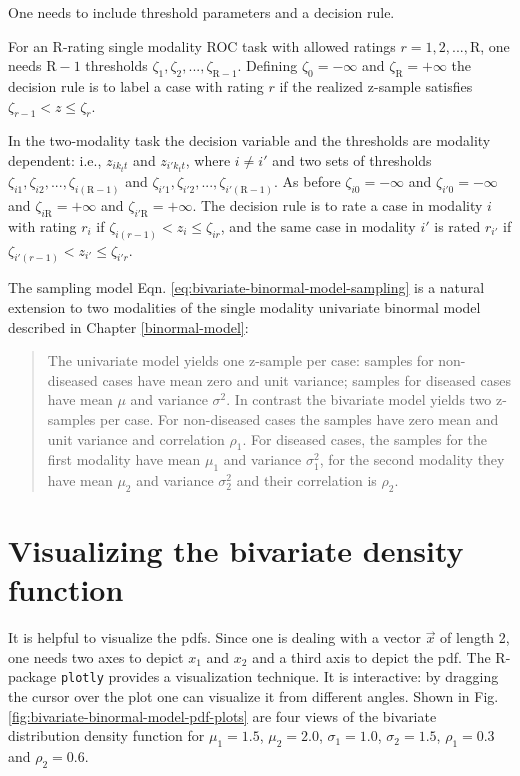 \documentclass[
]{book}
\begin{document}
One needs to include threshold parameters and a decision rule.

For an R-rating single modality ROC task with allowed ratings \(r = 1, 2, ..., \text{R}\), one needs \(\text{R}-1\) thresholds \(\zeta_1,\zeta_2,...,\zeta_{\text{R}-1}\). Defining \(\zeta_0 = -\infty\) and \(\zeta_{\text{R}} = +\infty\) the decision rule is to label a case with rating \(r\) if the realized z-sample satisfies \(\zeta_{r-1} < z \le \zeta_r\).

In the two-modality task the decision variable and the thresholds are modality dependent: i.e., \(z_{ik_tt}\) and \(z_{i'k_tt}\), where \(i \ne i'\) and two sets of thresholds \(\zeta_{i1},\zeta_{i2},...,\zeta_{i (\text{R}-1)}\) and \(\zeta_{i'1},\zeta_{i'2},...,\zeta_{i' (\text{R}-1)}\). As before \(\zeta_{i0} = -\infty\) and \(\zeta_{i'0} = -\infty\) and \(\zeta_{i\text{R}} = +\infty\) and \(\zeta_{i'\text{R}} = +\infty\). The decision rule is to rate a case in modality \(i\) with rating \(r_i\) if \(\zeta_{i(r-1)} < z_i \le \zeta_{ir}\), and the same case in modality \(i'\) is rated \(r_{i'}\) if \(\zeta_{i'(r-1)} < z_{i'} \le \zeta_{i'r}\).

The sampling model Eqn. \eqref{eq:bivariate-binormal-model-sampling} is a natural extension to two modalities of the single modality univariate binormal model described in Chapter \ref{binormal-model}:

\begin{quote}
The univariate model yields one z-sample per case: samples for non-diseased cases have mean zero and unit variance; samples for diseased cases have mean \(\mu\) and variance \(\sigma^2\). In contrast the bivariate model yields two z-samples per case. For non-diseased cases the samples have zero mean and unit variance and correlation \(\rho_1\). For diseased cases, the samples for the first modality have mean \(\mu_1\) and variance \(\sigma_1^2\), for the second modality they have mean \(\mu_2\) and variance \(\sigma_2^2\) and their correlation is \(\rho_2\).
\end{quote}

\hypertarget{bivariate-binormal-model-multivariate-density-visualization}{%
\section{Visualizing the bivariate density function}\label{bivariate-binormal-model-multivariate-density-visualization}}

It is helpful to visualize the pdfs. Since one is dealing with a vector \(\overrightarrow{x}\) of length 2, one needs two axes to depict \(x_1\) and \(x_2\) and a third axis to depict the pdf. The R-package \texttt{plotly} \citep{R-plotly} provides a visualization technique. It is interactive: by dragging the cursor over the plot one can visualize it from different angles. Shown in Fig. \ref{fig:bivariate-binormal-model-pdf-plots} are four views of the bivariate distribution density function for \(\mu_1 = 1.5\), \(\mu_2 = 2.0\), \(\sigma_1 = 1.0\), \(\sigma_2 = 1.5\), \(\rho_1 = 0.3\) and \(\rho_2 = 0.6\).
\end{document}
